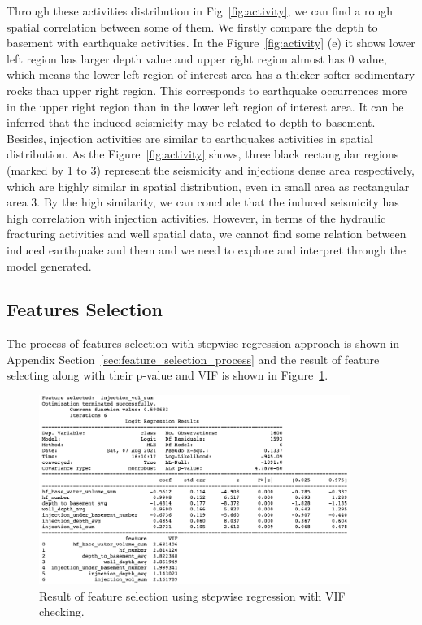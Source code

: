 \documentclass[final-report]{report-template}
\begin{document}
Through these activities distribution in Fig~\ref{fig:activity}, we can find a rough spatial correlation between some of them.
We firstly compare the depth to basement with earthquake activities. In the Figure~\ref{fig:activity} (e) it shows lower left region has larger depth value and upper right region almost has 0 value,
which means the lower left region of interest area has a thicker softer sedimentary rocks than upper right region.
This corresponds to earthquake occurrences more in the upper right region than in the lower left region of interest area.
It can be inferred that the induced seismicity may be related to depth to basement. 
Besides, injection activities are similar to earthquakes activities in spatial distribution. 
As the Figure~\ref{fig:activity} shows, three black rectangular regions (marked by 1 to 3) represent the seismicity and injections dense area respectively, which are highly similar in spatial distribution, even in small area as rectangular area 3. 
By the high similarity, we can conclude that the induced seismicity has high correlation with injection activities.
However, in terms of the hydraulic fracturing activities and well spatial data, we cannot find some relation between induced earthquake and them and we need to explore and interpret through the model generated.

\subsection{Features Selection}
The process of features selection with stepwise regression approach is shown in Appendix Section~\ref{sec:feature_selection_process} and the result of feature selecting along with their p-value and VIF is shown in Figure~\ref{fig:stepwise}.

\begin{figure}[H]
    \begin{center}
        \includegraphics[width=0.9\textwidth]{stepwise.png}
    \end{center}
    \caption{\label{fig:stepwise} Result of feature selection using stepwise regression with VIF checking.}
\end{figure}
\end{document}
